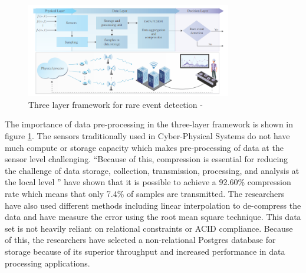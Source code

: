 \begin{figure}[H]
    \includegraphics[width=0.8\textwidth]{Images/three-layer-system.PNG}
    \caption{Three layer framework for rare event detection - \parencite{three-layer-approach}}
    \label{fig:three-layer}
\end{figure}
The importance of data pre-processing in the three-layer framework is shown \parencite{three-layer-approach} in figure \ref{fig:three-layer}. The sensors traditionally used in Cyber-Physical Systems do not have much compute or storage capacity which makes pre-processing of data at the sensor level challenging. \enquote{Because of this, compression is essential for reducing the challenge of data storage, collection, transmission, processing, and analysis at the local level \parencite{compression}} \parencite{wp3.2} have shown that it is possible to achieve a 92.60\% compression rate which means that only 7.4\% of samples are transmitted. The researchers have also used different methods including linear interpolation to de-compress the data and have measure the error using the root mean square technique. This data set is not heavily reliant on relational constraints or ACID compliance. Because of this, the researchers have selected a non-relational Postgres database for storage because of its superior throughput and increased performance in data processing applications.

